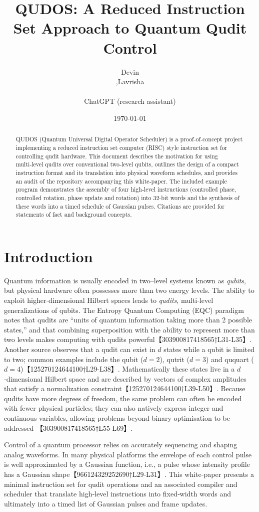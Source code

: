 \documentclass[11pt]{article}
\title{QUDOS: A Reduced Instruction Set Approach to Quantum Qudit Control}
\author{Devin\\,Lavrisha \\\\ ChatGPT (research assistant)}
\date{\today}
\begin{document}
\maketitle

\begin{abstract}
QUDOS (Quantum Universal Digital Operator Scheduler) is a proof‑of‑concept
project implementing a reduced instruction set computer (RISC) style
instruction set for controlling qudit hardware.  This document describes
the motivation for using multi‑level qudits over conventional two‑level
qubits, outlines the design of a compact instruction format and its
translation into physical waveform schedules, and provides an audit of the
repository accompanying this white‑paper.  The included example program
demonstrates the assembly of four high‑level instructions (controlled
phase, controlled rotation, phase update and rotation) into 32‑bit words
and the synthesis of these words into a timed schedule of Gaussian
pulses.  Citations are provided for statements of fact and background
concepts.
\end{abstract}

\section{Introduction}
Quantum information is usually encoded in two–level systems known as
\emph{qubits}, but physical hardware often possesses more than two
energy levels.  The ability to exploit higher‑dimensional Hilbert
spaces leads to \emph{qudits}, multi‑level generalizations of qubits.
The Entropy Quantum Computing (EQC) paradigm notes that qudits are
``units of quantum information taking more than 2 possible states,'' and
that combining superposition with the ability to represent more than two
levels makes computing with qudits powerful【303900817418565†L31-L35】.
Another source observes that a qudit can exist in $d$ states while a
qubit is limited to two; common examples include the qubit ($d=2$),
qutrit ($d=3$) and ququart ($d=4$)【125270124644100†L29-L38】.  Mathematically
these states live in a $d$‑dimensional Hilbert space and are described
by vectors of complex amplitudes that satisfy a normalization
constraint【125270124644100†L39-L50】.  Because qudits have more degrees of
freedom, the same problem can often be encoded with fewer physical
particles; they can also natively express integer and continuous
variables, allowing problems beyond binary optimisation to be addressed
【303900817418565†L55-L69】.

Control of a quantum processor relies on accurately sequencing and
shaping analog waveforms.  In many physical platforms the envelope of
each control pulse is well approximated by a Gaussian function, i.e.,
a pulse whose intensity profile has a Gaussian shape【966124329252690†L29-L31】.
This white‑paper presents a minimal instruction set for qudit
operations and an associated compiler and scheduler that translate
high‑level instructions into fixed‑width words and ultimately into a
timed list of Gaussian pulses and frame updates.
\end{document}
